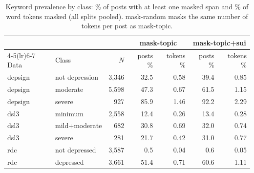 \begin{table}[t]
\centering
\caption{Keyword prevalence by class: \% of posts with at least one masked span and \% of word tokens masked (all splits pooled). mask-random masks the same number of tokens per post as mask-topic.}
\label{tab:prevalence}
\begin{tabular}{llrrrrr}
\toprule
 & & & \multicolumn{2}{c}{mask-topic} & \multicolumn{2}{c}{mask-topic+sui} \\
\cmidrule(lr){4-5}\cmidrule(lr){6-7}
Data & Class & $N$ & posts \% & tokens \% & posts \% & tokens \% \\
\midrule
depsign & not depression & 3,346 & 32.5 & 0.58 & 39.4 & 0.85 \\
depsign & moderate & 5,598 & 47.3 & 0.67 & 61.5 & 1.15 \\
depsign & severe & 927 & 85.9 & 1.46 & 92.2 & 2.29 \\
dsl3 & minimum & 2,558 & 12.4 & 0.26 & 13.4 & 0.28 \\
dsl3 & mild+moderate & 682 & 30.8 & 0.69 & 32.0 & 0.74 \\
dsl3 & severe & 281 & 21.7 & 0.42 & 31.0 & 0.77 \\
rdc & not depressed & 3,587 & 0.5 & 0.04 & 0.6 & 0.05 \\
rdc & depressed & 3,661 & 51.4 & 0.71 & 60.6 & 1.11 \\
\bottomrule
\end{tabular}
\end{table}
